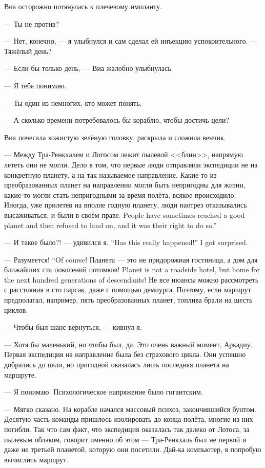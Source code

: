 Виа осторожно потянулась к плечевому импланту.

--- Ты не против?

--- Нет, конечно, --- я улыбнулся и сам сделал ей инъекцию успокоительного.
--- Тяжёлый день?

--- Если бы только день, --- Виа жалобно улыбнулась.

--- Я тебя понимаю.

--- Ты один из немногих, кто может понять.

--- А сколько времени потребовалось бы кораблю, чтобы достичь цели?

Виа почесала кожистую зелёную головку, раскрыла и сложила венчик.

--- Между Тра-Ренкхалем и Лотосом лежит пылевой <<блин>>, напрямую лететь они не могли.
Дело в том, что первые люди отправляли экспедиции не на конкретную планету, а на так называемое направление.
Какие-то из преобразованных планет на направлении могли быть непригодны для жизни, какие-то могли стать непригодными за время полёта, всякое происходило.
{Иногда, уже прилетев на вполне годную планету, люди наотрез отказывались высаживаться, и были в своём праве.}
{People have sometimes reached a good planet and then refused to land on, and it was their right to do so.''}

{--- И такое было?! --- удивился я.}
{``Has this really happened!'' I got surprised.}

{--- Разумеется!}
{``Of course!}
{Планета --- это не придорожная гостиница, а дом для ближайших ста поколений потомков!}
{Planet is not a roadside hotel, but home for the next hundred generations of descendants!}
Не все нюансы можно рассмотреть с расстояния в сто парсак, даже с помощью демиурга.
Поэтому, если маршрут предполагал, например, пять преобразованных планет, топлива брали на шесть циклов.

--- Чтобы был шанс вернуться, --- кивнул я.

--- Хотя бы маленький, но чтобы был, да.
Это очень важный момент, Аркадиу.
Первая экспедиция на направление была без страхового цикла.
Они успешно добрались до цели, но пригодной оказалась лишь последняя планета на маршруте.

--- Я понимаю.
Психологическое напряжение было гигантским.

--- Мягко сказано.
На корабле начался массовый психоз, закончившийся бунтом.
Десятую часть команды пришлось изолировать до конца полёта, многие из них погибли.
Так что сам факт, что экспедиция оказалась так далеко от Лотоса, за пылевым облаком, говорит именно об этом --- Тра-Ренкхаль был не первой и даже не третьей планетой, которую они посетили.
Дай-ка компьютер, я попробую вычислить маршрут.

